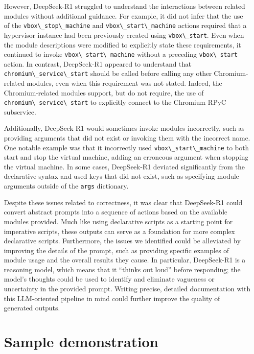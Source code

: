 \documentclass[final,5p,times,twocolumn]{elsarticle}
\newcommand{\passthrough}[1]{#1}
\begin{document}
However, DeepSeek-R1 struggled to understand the interactions between
related modules without additional guidance. For example, it did not
infer that the use of the \passthrough{\lstinline!vbox\_stop\_machine!}
and \passthrough{\lstinline!vbox\_start\_machine!} actions required that
a hypervisor instance had been previously created using
\passthrough{\lstinline!vbox\_start!}. Even when the module descriptions
were modified to explicitly state these requirements, it continued to
invoke \passthrough{\lstinline!vbox\_start\_machine!} without a
preceding \passthrough{\lstinline!vbox\_start!} action. In contrast,
DeepSeek-R1 appeared to understand that
\passthrough{\lstinline!chromium\_service\_start!} should be called
before calling any other Chromium-related modules, even when this
requirement was not stated. Indeed, the Chromium-related modules
support, but do not require, the use of
\passthrough{\lstinline!chromium\_service\_start!} to explicitly connect
to the Chromium RPyC subservice.

Additionally, DeepSeek-R1 would sometimes invoke modules incorrectly,
such as providing arguments that did not exist or invoking them with the
incorrect name. One notable example was that it incorrectly used
\passthrough{\lstinline!vbox\_start\_machine!} to both start and stop
the virtual machine, adding an erroneous argument when stopping the
virtual machine. In some cases, DeepSeek-R1 deviated significantly from
the declarative syntax and used keys that did not exist, such as
specifying module arguments outside of the
\passthrough{\lstinline!args!} dictionary.

Despite these issues related to correctness, it was clear that
DeepSeek-R1 could convert abstract prompts into a sequence of actions
based on the available modules provided. Much like using declarative
scripts as a starting point for imperative scripts, these outputs can
serve as a foundation for more complex declarative scripts. Furthermore,
the issues we identified could be alleviated by improving the details of
the prompt, such as providing specific examples of module usage and the
overall results they cause. In particular, DeepSeek-R1 is a reasoning
model, which means that it ``thinks out loud'' before responding; the
model's thoughts could be used to identify and eliminate vagueness or
uncertainty in the provided prompt. Writing precise, detailed
documentation with this LLM-oriented pipeline in mind could further
improve the quality of generated outputs.

\section{Sample demonstration}\label{sample-demonstration}
\end{document}
